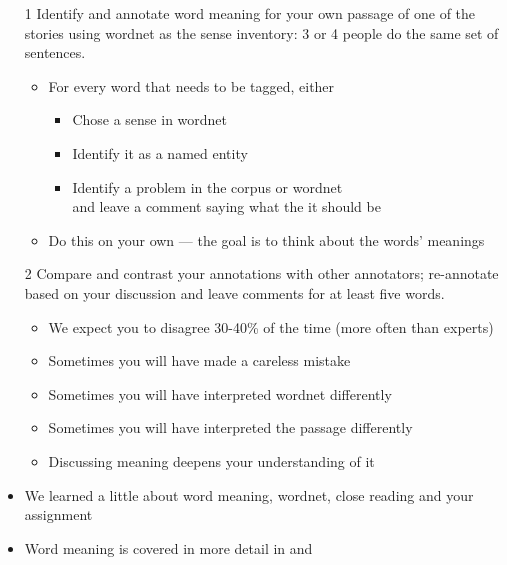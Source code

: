 \documentclass[a4paper,landscape,headrule,footrule,xetex]{foils}
\begin{document}
\begin{itemize}
\item[1] Identify and annotate word meaning for your own passage of
  one of the stories using wordnet as the sense inventory: 3 or 4 people do
  the same set of sentences.
  \begin{itemize}
  \item For every word that needs to be tagged, either
    \begin{itemize}
    \item Chose a sense in wordnet
    \item Identify it as a named entity
    \item Identify a problem in the corpus or wordnet
      \\ and leave a comment saying what the it should be
    \end{itemize}
  \item Do this on your own --- the goal is to think about the words' meanings
  \end{itemize}
\item[2] Compare and contrast your annotations with other annotators;
  re-annotate based on your discussion and leave comments for at least
  five words.
  \begin{itemize}
  \item We expect you to disagree 30-40\% of the time (more often than experts)
  \item Sometimes you will have made a careless mistake
  \item Sometimes you will have interpreted wordnet differently
  \item Sometimes you will have interpreted the passage differently
  \item Discussing meaning deepens your understanding of it
  \end{itemize}
\end{itemize}









\begin{itemize}
\item We learned a little about word meaning, wordnet, close reading and your assignment
\item Word meaning is covered in more detail in \citet[Chapter~3]{Saeed:2015}  and \citet[Chapter~6 and~7]{Kroeger:2022}
\end{itemize}
\end{document}
